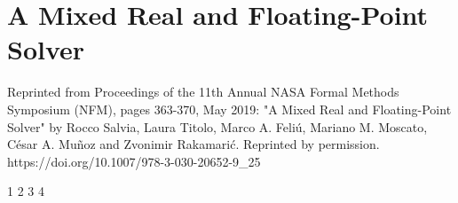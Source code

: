 
\chapter{A Mixed Real and Floating-Point Solver}
\label{sec:fprock}
Reprinted from Proceedings of the 11th Annual NASA Formal Methods Symposium (NFM), pages 363-370, May 2019: "A Mixed Real and Floating-Point Solver" by Rocco Salvia, Laura Titolo, Marco A. Feli\'{u}, Mariano M. Moscato, C\'{e}sar A. Mu\~{n}oz and Zvonimir Rakamari\'c. Reprinted by permission.\\
https://doi.org/10.1007/978-3-030-20652-9\_25


\setupuuchapterbib

                              		{1}
		{2}
       				{3}
                      					{4}






%
%